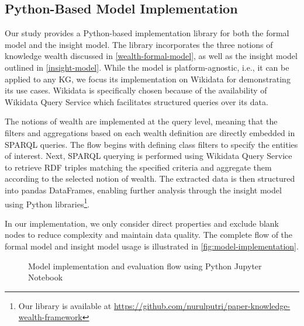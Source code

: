 \subsection{Python-Based Model Implementation}

Our study provides a Python-based implementation library for both the formal model and the insight model. The library incorporates the three notions of knowledge wealth discussed in \autoref{wealth-formal-model}, as well as the insight model outlined in \autoref{insight-model}. While the model is platform-agnostic, i.e., it can be applied to any KG, we focus its implementation on Wikidata for demonstrating its use cases. Wikidata is specifically chosen because of the availability of Wikidata Query Service which  facilitates structured queries over its data.

The notions of wealth are implemented at the query level, meaning that the filters and aggregations based on each wealth definition are directly embedded in SPARQL queries. The flow begins with defining class filters to specify the entities of interest. Next, SPARQL querying is performed using Wikidata Query Service to retrieve RDF triples matching the specified criteria and aggregate them according to the selected notion of wealth. The extracted data is then structured into pandas DataFrames, enabling further analysis through the insight model using Python libraries\footnote{Our library is available at \url{https://github.com/nurulputri/paper-knowledge-wealth-framework}}.

In our implementation, we only consider direct properties and exclude blank nodes to reduce complexity and maintain data quality. The complete flow of the formal model and insight model usage is illustrated in \autoref{fig:model-implementation}.

\begin{figure}[!htbp]
    \centering
    \caption{Model implementation and evaluation flow using Python Jupyter Notebook} \label{fig:model-implementation}
\end{figure}